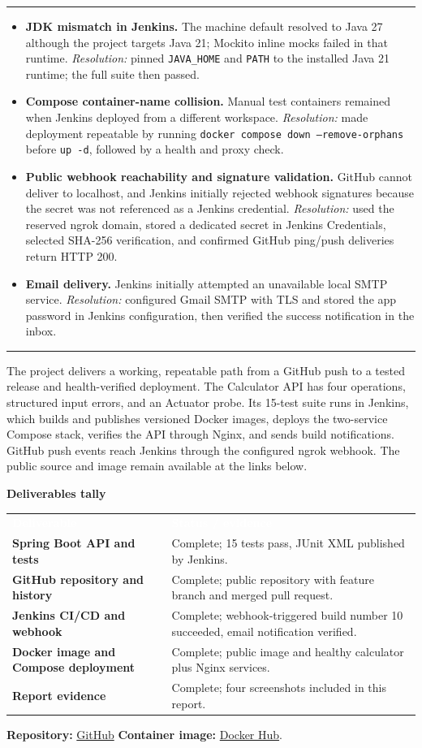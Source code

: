 \documentclass[10pt,a4paper]{article}
\newcommand{\sectiontitle}[1]{\par\addvspace{1.5\baselineskip}{\large\bfseries\color{navy}#1}\par\vspace{3pt}\textcolor{blue!35}{\rule{\linewidth}{0.6pt}}\vspace{5pt}}
\newcommand{\subhead}[1]{{\bfseries\color{blue}#1}\par\vspace{1pt}}
\begin{document}
\sectiontitle{5. Challenges faced and solutions}
\begin{itemize}
\item \textbf{JDK mismatch in Jenkins.} The machine default resolved to Java 27 although the project targets Java 21; Mockito inline mocks failed in that runtime. \textit{Resolution:} pinned \texttt{JAVA\_HOME} and \texttt{PATH} to the installed Java 21 runtime; the full suite then passed.
\item \textbf{Compose container-name collision.} Manual test containers remained when Jenkins deployed from a different workspace. \textit{Resolution:} made deployment repeatable by running \texttt{docker compose down --remove-orphans} before \texttt{up -d}, followed by a health and proxy check.
\item \textbf{Public webhook reachability and signature validation.} GitHub cannot deliver to localhost, and Jenkins initially rejected webhook signatures because the secret was not referenced as a Jenkins credential. \textit{Resolution:} used the reserved ngrok domain, stored a dedicated secret in Jenkins Credentials, selected SHA-256 verification, and confirmed GitHub ping/push deliveries return HTTP 200.
\item \textbf{Email delivery.} Jenkins initially attempted an unavailable local SMTP service. \textit{Resolution:} configured Gmail SMTP with TLS and stored the app password in Jenkins configuration, then verified the success notification in the inbox.
\end{itemize}

\sectiontitle{6. Conclusion}
The project delivers a working, repeatable path from a GitHub push to a tested release and health-verified deployment. The Calculator API has four operations, structured input errors, and an Actuator probe. Its 15-test suite runs in Jenkins, which builds and publishes versioned Docker images, deploys the two-service Compose stack, verifies the API through Nginx, and sends build notifications. GitHub push events reach Jenkins through the configured ngrok webhook. The public source and image remain available at the links below.

\subhead{Deliverables tally}
\begin{tabularx}{\linewidth}{@{}>{\bfseries}p{3.8cm} X@{}}
\rowcolor{blue!85!navy}\textcolor{white}{Deliverable} & \textcolor{white}{\textbf{Status / evidence}}\\
Spring Boot API and tests & Complete; 15 tests pass, JUnit XML published by Jenkins.\\
GitHub repository and history & Complete; public repository with feature branch and merged pull request.\\
Jenkins CI/CD and webhook & Complete; webhook-triggered build number 10 succeeded, email notification verified.\\
Docker image and Compose deployment & Complete; public image and healthy calculator plus Nginx services.\\
Report evidence & Complete; four screenshots included in this report.\\
\end{tabularx}

\smallskip
\textbf{Repository:} \href{https://github.com/KaushalrajPuwar/arithmos-pipeline}{GitHub} \quad
\textbf{Container image:} \href{https://hub.docker.com/r/kaushalrajpuwar/arithmos-calculator}{Docker Hub}.
\end{document}
